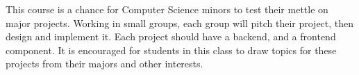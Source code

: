 This course is a chance for Computer Science minors to test their mettle on major projects. Working in small groups, each group will pitch their project, then design and implement it. Each project should have a backend, and a frontend component. It is encouraged for students in this class to draw topics for these projects from their majors and other interests.